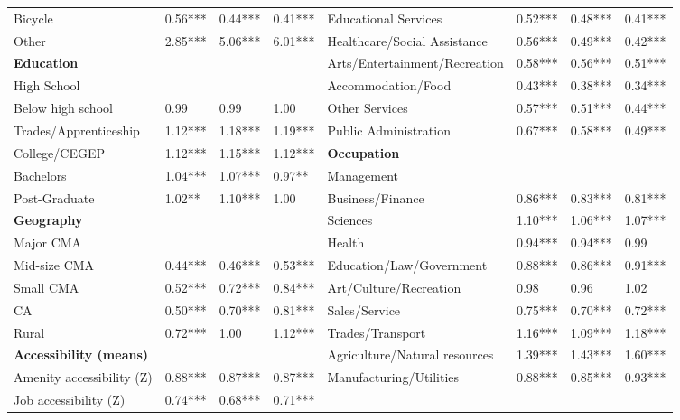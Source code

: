 \documentclass[10 pt,letterpaper]{article}
\begin{document}
\begin{table}[H]
{\begin{tabular}{llllllll}
			Bicycle                        & 0.56***   & 0.44***  & 0.41***  & Educational Services          & 0.52***   & 0.48***  & 0.41***  \\
			Other                          & 2.85***   & 5.06***  & 6.01***  & Healthcare/Social Assistance  & 0.56***   & 0.49***  & 0.42***  \\
			\textbf{Education}             &           &          &          & Arts/Entertainment/Recreation & 0.58***   & 0.56***  & 0.51***  \\
			High School                    &           &          &          & Accommodation/Food            & 0.43***   & 0.38***  & 0.34***  \\
			Below high school              & 0.99      & 0.99     & 1.00     & Other Services                & 0.57***   & 0.51***  & 0.44***  \\
			Trades/Apprenticeship          & 1.12***   & 1.18***  & 1.19***  & Public Administration         & 0.67***   & 0.58***  & 0.49***  \\
			College/CEGEP                  & 1.12***   & 1.15***  & 1.12***  & \textbf{Occupation}           &           &          &          \\
			Bachelors                      & 1.04***   & 1.07***  & 0.97**   & Management                    &           &          &          \\
			Post-Graduate                  & 1.02**    & 1.10***  & 1.00     & Business/Finance              & 0.86***   & 0.83***  & 0.81***  \\
			\textbf{Geography}             &           &          &          & Sciences                      & 1.10***   & 1.06***  & 1.07***  \\
			Major CMA                      &           &          &          & Health                        & 0.94***   & 0.94***  & 0.99     \\
			Mid-size CMA                   & 0.44***   & 0.46***  & 0.53***  & Education/Law/Government      & 0.88***   & 0.86***  & 0.91***  \\
			Small CMA                      & 0.52***   & 0.72***  & 0.84***  & Art/Culture/Recreation        & 0.98      & 0.96     & 1.02     \\
			CA                             & 0.50***   & 0.70***  & 0.81***  & Sales/Service                 & 0.75***   & 0.70***  & 0.72***  \\
			Rural                          & 0.72***   & 1.00     & 1.12***  & Trades/Transport              & 1.16***   & 1.09***  & 1.18***  \\
			\textbf{Accessibility (means)} &           &          &          & Agriculture/Natural resources & 1.39***   & 1.43***  & 1.60***  \\
			Amenity accessibility (Z)      & 0.88***   &  0.87*** & 0.87***  & Manufacturing/Utilities       & 0.88***   & 0.85***  & 0.93***  \\
			Job accessibility (Z)          & 0.74***   & 0.68***  & 0.71***  &                               &           &          &            \\ \hline
			

\end{tabular}}
\end{table}
\end{document}
